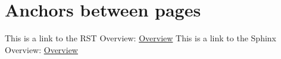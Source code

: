 \label{index}

\chapter{Anchors between pages}
This is a link to the RST Overview: \href{overview.tex#rst-overview}{Overview}
This is a link to the Sphinx Overview: \href{overview.tex#sphinx-overview}{Overview}
